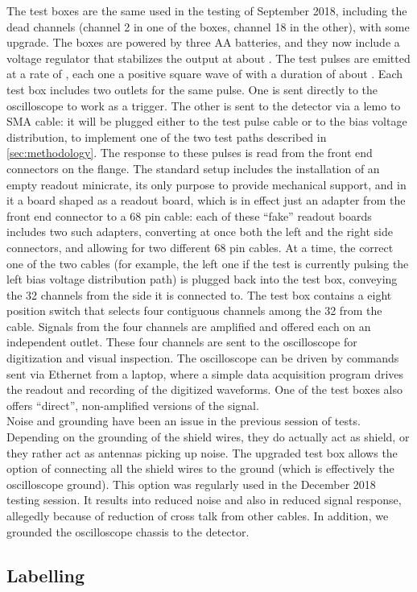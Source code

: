 The test boxes are the same used in the testing of September 2018, including the
dead channels (channel 2 in one of the boxes, channel 18 in the other), with
some upgrade.
The boxes are powered by three  AA batteries, and they now include a
voltage regulator that stabilizes the output at about .
The test pulses are emitted at a rate of , each one a positive square
wave of  with a duration of about .
Each test box includes two outlets for the same pulse.
One is sent directly to the oscilloscope to work as a trigger.
The other is sent to the detector via a lemo to SMA cable: it will be plugged
either to the test pulse cable or to the bias voltage distribution, to implement
one of the two test paths described in \cref{sec:methodology}.
The response to these pulses is read from the front end connectors on the
flange.
The standard setup includes the installation of an empty readout minicrate, its
only purpose to provide mechanical support, and in it a board shaped as a
readout board, which is in effect just an adapter from the front end connector
to a 68 pin cable: each of these ``fake'' readout boards includes two such
adapters, converting at once both the left and the right side connectors,
and allowing for two different 68 pin cables.
At a time, the correct one of the two cables (for example, the left one if the
test is currently pulsing the left bias voltage distribution path) is plugged
back into the test box, conveying the 32 channels from the \DBB side it is
connected to.
The test box contains a eight position switch that selects four contiguous
channels among the 32 from the cable.
Signals from the four channels are amplified and offered each on an independent
outlet.
These four channels are sent to the oscilloscope for digitization and visual
inspection.
The oscilloscope can be driven by commands sent via Ethernet from a laptop,
where a simple data acquisition program drives the readout and recording of the
digitized waveforms.
One of the test boxes also offers ``direct'', non-amplified versions of the
signal.
\\
Noise and grounding have been an issue in the previous session of tests.
Depending on the grounding of the shield wires, they do actually act as shield,
or they rather act as antennas picking up noise.
The upgraded test box allows the option of connecting all the shield wires to
the ground (which is effectively the oscilloscope ground).
This option was regularly used in the December 2018 testing session.
It results into reduced noise and also in reduced signal response, allegedly
because of reduction of cross talk from other cables.
In addition, we grounded the oscilloscope chassis to the detector.


\subsection{Labelling}
\label{ssec:labelling}

